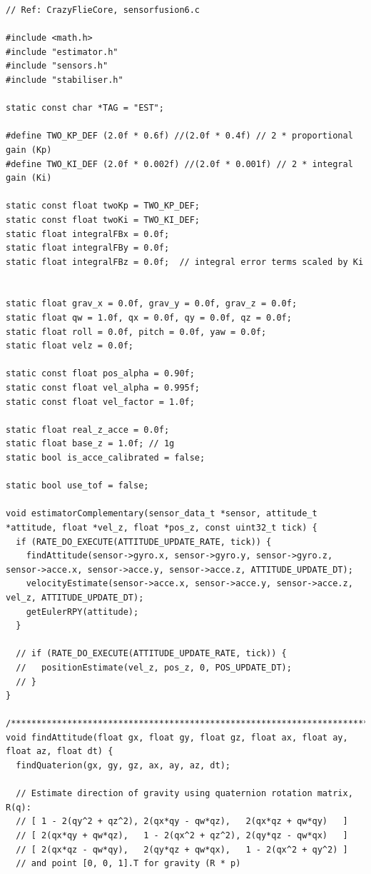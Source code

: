 \begin{lstlisting}
// Ref: CrazyFlieCore, sensorfusion6.c 

#include <math.h>
#include "estimator.h"
#include "sensors.h"
#include "stabiliser.h"

static const char *TAG = "EST";

#define TWO_KP_DEF (2.0f * 0.6f) //(2.0f * 0.4f) // 2 * proportional gain (Kp)
#define TWO_KI_DEF (2.0f * 0.002f) //(2.0f * 0.001f) // 2 * integral gain (Ki)

static const float twoKp = TWO_KP_DEF;    
static const float twoKi = TWO_KI_DEF;    
static float integralFBx = 0.0f;
static float integralFBy = 0.0f;
static float integralFBz = 0.0f;  // integral error terms scaled by Ki


static float grav_x = 0.0f, grav_y = 0.0f, grav_z = 0.0f;
static float qw = 1.0f, qx = 0.0f, qy = 0.0f, qz = 0.0f; 
static float roll = 0.0f, pitch = 0.0f, yaw = 0.0f;
static float velz = 0.0f;

static const float pos_alpha = 0.90f;
static const float vel_alpha = 0.995f;
static const float vel_factor = 1.0f;

static float real_z_acce = 0.0f;
static float base_z = 1.0f; // 1g 
static bool is_acce_calibrated = false;

static bool use_tof = false;

void estimatorComplementary(sensor_data_t *sensor, attitude_t *attitude, float *vel_z, float *pos_z, const uint32_t tick) {
  if (RATE_DO_EXECUTE(ATTITUDE_UPDATE_RATE, tick)) {
    findAttitude(sensor->gyro.x, sensor->gyro.y, sensor->gyro.z, sensor->acce.x, sensor->acce.y, sensor->acce.z, ATTITUDE_UPDATE_DT);
    velocityEstimate(sensor->acce.x, sensor->acce.y, sensor->acce.z, vel_z, ATTITUDE_UPDATE_DT);
    getEulerRPY(attitude); 
  }

  // if (RATE_DO_EXECUTE(ATTITUDE_UPDATE_RATE, tick)) {
  //   positionEstimate(vel_z, pos_z, 0, POS_UPDATE_DT);
  // }
}

/**********************************************************************/
void findAttitude(float gx, float gy, float gz, float ax, float ay, float az, float dt) {
  findQuaterion(gx, gy, gz, ax, ay, az, dt);
  
  // Estimate direction of gravity using quaternion rotation matrix, R(q):
  // [ 1 - 2(qy^2 + qz^2), 2(qx*qy - qw*qz),   2(qx*qz + qw*qy)   ]
  // [ 2(qx*qy + qw*qz),   1 - 2(qx^2 + qz^2), 2(qy*qz - qw*qx)   ]
  // [ 2(qx*qz - qw*qy),   2(qy*qz + qw*qx),   1 - 2(qx^2 + qy^2) ]
  // and point [0, 0, 1].T for gravity (R * p) 
  

\end{lstlisting}
